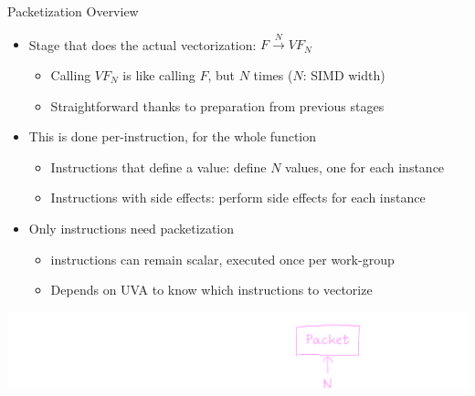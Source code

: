 
\begin{frame}{Packetization Overview}

\begin{itemize}
    \item Stage that does the actual vectorization: $ F \xrightarrow{N} VF_N$
    \begin{itemize}
        \item Calling $VF_N$ is like calling $F$, but $N$ times ($N$: SIMD width)
        \item Straightforward thanks to preparation from previous stages
    \end{itemize}
    
    \item This is done per-instruction, for the whole function
    \begin{itemize}
        \item Instructions that define a value: define $N$ values, one for each instance
        \item Instructions with side effects: perform side effects for each instance
    \end{itemize}
    
    \item Only  instructions need packetization
    \begin{itemize}
        \item {} instructions can remain scalar, executed once per work-group
        \item Depends on UVA to know which instructions to vectorize
    \end{itemize}
    
\end{itemize}

\vspace{1.5ex}
\hspace{1em}\includegraphics[scale=0.55]{images/stages-packet.pdf}

\end{frame}


